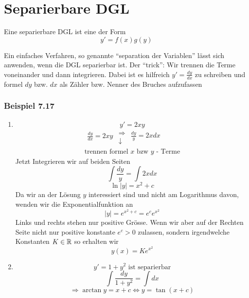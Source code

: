 \section{Separierbare DGL}
\begin{definition}{7.16}
Eine separierbare DGL ist eine der Form \[y'=f(x)g(y)\]
\end{definition}
Ein einfaches Verfahren, so genannte ``separation der Variablen'' lässt sich anwenden, wenn die DGL separierbar ist. Der ``trick'': Wir trennen die Terme voneinander und dann integrieren. Dabei ist es hilfreich $y'=\frac{dy}{dx}$ zu schreiben und formel $dy$ bzw. $dx$ als Zähler bzw. Nenner des Bruches aufzufassen

\subsubsection*{Beispiel 7.17}
\begin{enumerate}
\item \[y'=2xy\]\[\begin{array}{l}
\begin{array}{*{20}{c}}
{\frac{{dy}}{{dx}} = 2xy}\\
{}
\end{array}\begin{array}{*{20}{c}}
 \Rightarrow \\
 \downarrow 
\end{array}\begin{array}{*{20}{c}}
{\frac{{dy}}{y} = 2xdx}\\
{}
\end{array}\\
{\text{trennen formel }}x{\text{ bzw }}y{\text{ - Terme}}
\end{array}\]
Jetzt Integrieren wir auf beiden Seiten \[\int{\frac{dy}{y}}=\int{2xdx}\]
\[\ln\left| y\right|=x^2+c\]Da wir an der Lösung $y$ interessiert sind und nicht am Logarithmus davon, wenden wir die Exponentialfunktion an \[\left| y\right|=e^{x^2+c}=e^ce^{x^2}\]
Links und rechts stehen nur positive Grösse. Wenn wir aber auf der Rechten Seite nicht nur positive konstante $e^c>0$ zulassen, sondern irgendwelche Konstanten $K\in\mathbb{R}$ so erhalten wir \[y(x)=Ke^{x^2}\]
\item \[y'=1+y^2\text{ ist separierbar}\]
\[\int{\frac{dy}{1+y^2}=\int{dx}}\]
\[\Rightarrow \arctan y=x+c \Leftrightarrow y=\tan(x+c)\]
\end{enumerate}
